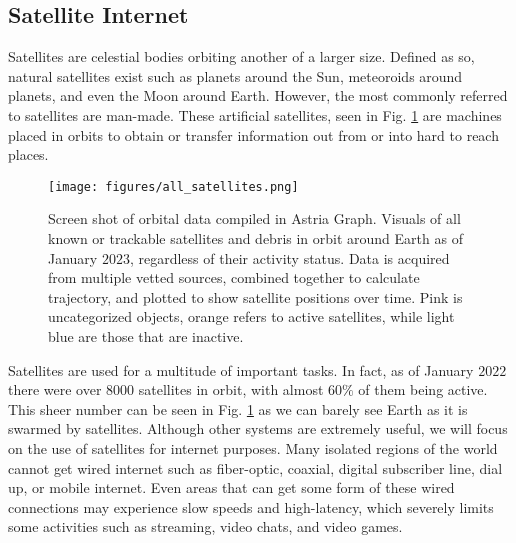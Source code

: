 \documentclass[10pt]{article}
\begin{document}
\subsection{Satellite Internet}
\label{satellite_intro}
Satellites are celestial bodies orbiting another of a larger size. Defined as so, natural satellites exist such as planets around the Sun, meteoroids around planets, and even the Moon around Earth. However, the most commonly referred to satellites are man-made. These artificial satellites, seen in Fig. \ref{fig:satellites} are machines placed in orbits to obtain or transfer information out from or into hard to reach places.

\begin{figure}[h!]
\centering
\texttt{[image: figures/all\_satellites.png]}
\caption{Screen shot of orbital data compiled in Astria Graph. Visuals of all known or trackable satellites and debris in orbit around Earth as of January $2023$, regardless of their activity status. Data is acquired from multiple vetted sources, combined together to calculate trajectory, and plotted to show satellite positions over time. Pink is uncategorized objects, orange refers to active satellites, while light blue are those that are inactive\cite{Astria_Graph}.}
\label{fig:satellites}
\end{figure}

Satellites are used for a multitude of important tasks. In fact, as of January $2022$ there were over $8000$ satellites in orbit, with almost $60\%$ of them being active\cite{Mohanta_2022}. This sheer number can be seen in Fig. \ref{fig:satellites} as we can barely see Earth as it is swarmed by satellites. Although other systems are extremely useful, we will focus on the use of satellites for internet purposes. Many isolated regions of the world cannot get wired internet such as fiber-optic, coaxial, digital subscriber line, dial up, or mobile internet. Even areas that can get some form of these wired connections may experience slow speeds and high-latency, which severely limits some activities such as streaming, video chats, and video games\cite{Satellite_internet_latency_2021}.
\end{document}
